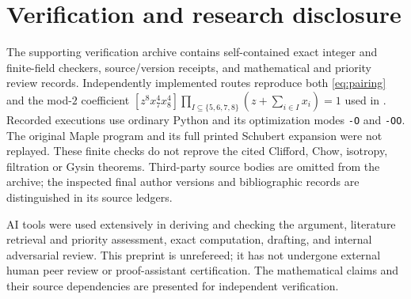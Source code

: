 \documentclass[11pt]{article}
\begin{document}
\section{Verification and research disclosure}

The supporting verification archive contains self-contained exact
integer and finite-field checkers, source/version receipts, and
mathematical and priority review records. Independently implemented
routes reproduce both \eqref{eq:pairing} and the mod-$2$ coefficient
$[z^8x_7^4x_8^4]\prod_{I\subseteq\{5,6,7,8\}}
(z+\sum_{i\in I}x_i)=1$ used in \cite{isotropy}.
Recorded executions use ordinary Python and its optimization modes
\texttt{-O} and \texttt{-OO}. The original Maple program and its full
printed Schubert expansion were not replayed. These finite checks do
not reprove the cited Clifford, Chow, isotropy, filtration or Gysin
theorems. Third-party source bodies are omitted from the archive;
the inspected final author versions and bibliographic records are
distinguished in its source ledgers.

AI tools were used extensively in deriving and checking the argument,
literature retrieval and priority assessment, exact computation,
drafting, and internal adversarial review. This preprint is unrefereed;
it has not undergone external human peer review or proof-assistant
certification. The mathematical claims and their source dependencies
are presented for independent verification.
\end{document}
